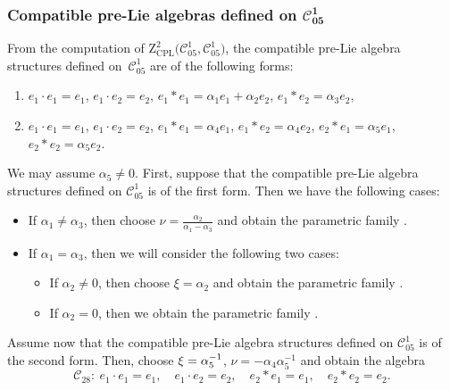 \documentclass[10pt,a4paper]{amsart}
\numberwithin{equation}{section}
\begin{document}
\subsubsection[Compatible pre-Lie algebras defined on C\_\{05\}\^{}1]{Compatible pre-Lie algebras defined on $\boldsymbol{\mathcal{C}_{05}^{1}}$}

From the computation of $\mathrm{Z}_{\mathrm{CPL}}^{2}\bigl(\mathcal{C}_{05}^{1},%
\mathcal{C}_{05}^{1}\bigr)$, the compatible pre-Lie algebra structures defined on~$\mathcal{C}_{05}^{1}$ are of the following forms:
\begin{enumerate}\itemsep=0pt
\item[(1)] $e_{1}\cdot e_{1}=e_{1}$, $e_{1}\cdot e_{2}=e_{2}$,
$e_{1}\ast e_{1}=\alpha _{1}e_{1}+\alpha _{2}e_{2}$, $e_{1}\ast
e_{2}=\alpha _{3}e_{2}$,
\item[(2)] $e_{1}\cdot e_{1}=e_{1}$, $e_{1}\cdot e_{2}=e_{2}$,
$e_{1}\ast e_{1}=\alpha _{4}e_{1}$, $e_{1}\ast e_{2}=\alpha _{4}e_{2}$, $e_{2}\ast e_{1}=\alpha _{5}e_{1}$, $e_{2}\ast e_{2}=\alpha _{5}e_{2}$.
\end{enumerate}

We may assume $\alpha _{5}\neq 0$.
First, suppose that the compatible
pre-Lie algebra structures defined on $\mathcal{C}_{05}^{1}$ is of the first
form. Then we have the following cases:
\begin{itemize}\itemsep=0pt
\item If $\alpha _{1}\neq\alpha _{3}$, then choose $\nu =\frac{\alpha _{2}%
}{\alpha _{1}-\alpha _{3}}$ and obtain the parametric family .

\item If $\alpha _{1}=\alpha _{3}$, then we will consider the following two cases:
\begin{itemize}\itemsep=0pt
\item If $\alpha _{2}\neq 0$, then choose $\xi =\alpha _{2}$ and
obtain the parametric family .
\item If $\alpha _{2}=0$, then we obtain the parametric family .
\end{itemize}
\end{itemize}

Assume now that the compatible pre-Lie algebra structures defined on $%
\mathcal{C}_{05}^{1}$ is of the second form. Then, choose $\xi ={%
\alpha^{-1} _{5}}$, $\nu =-{\alpha _{4}}{\alpha^{-1} _{5}}$ and obtain the algebra
\[
\mathcal{C}_{28} \colon \
e_{1}\cdot e_{1}=e_{1}, \quad e_{1}\cdot e_{2}=e_{2}, \quad
e_{2}\ast e_{1}=e_{1},\quad e_{2}\ast e_{2}=e_{2}.
\]
\end{document}
